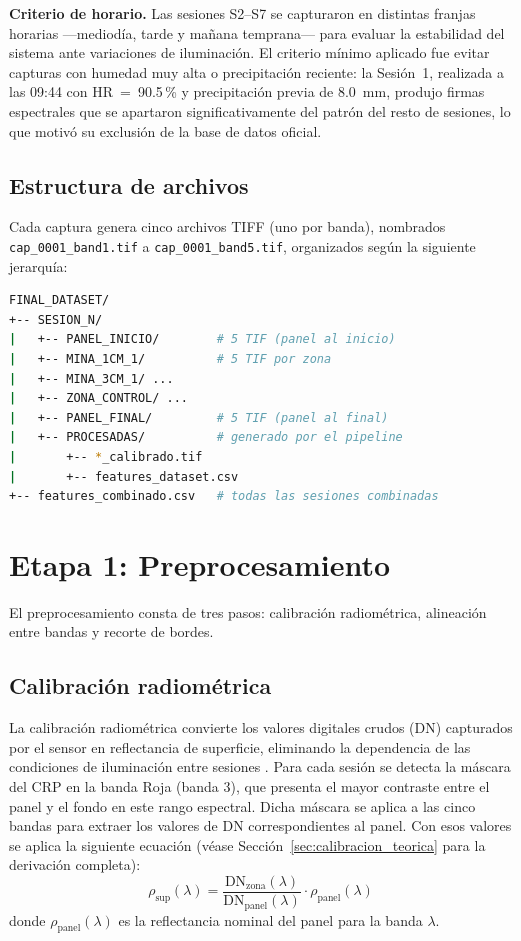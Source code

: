 \textbf{Criterio de horario.} Las sesiones S2--S7 se capturaron en distintas
franjas horarias ---mediodía, tarde y mañana temprana--- para
evaluar la estabilidad del sistema ante variaciones de iluminación. El
criterio mínimo aplicado fue evitar capturas con humedad muy alta o
precipitación reciente: la Sesión~1, realizada a las 09:44 con
HR~=~90.5\,\% y precipitación previa de 8.0~mm, produjo firmas espectrales
que se apartaron significativamente del patrón del resto de sesiones, lo que
motivó su exclusión de la base de datos oficial.

\subsection{Estructura de archivos}

Cada captura genera cinco archivos TIFF (uno por banda), nombrados
\texttt{cap\_0001\_band1.tif} a \texttt{cap\_0001\_band5.tif}, organizados
según la siguiente jerarquía:

\begin{lstlisting}[language=bash, caption={Estructura del conjunto de datos}, label={lst:estructura}]
FINAL_DATASET/
+-- SESION_N/
|   +-- PANEL_INICIO/        # 5 TIF (panel al inicio)
|   +-- MINA_1CM_1/          # 5 TIF por zona
|   +-- MINA_3CM_1/ ...
|   +-- ZONA_CONTROL/ ...
|   +-- PANEL_FINAL/         # 5 TIF (panel al final)
|   +-- PROCESADAS/          # generado por el pipeline
|       +-- *_calibrado.tif
|       +-- features_dataset.csv
+-- features_combinado.csv   # todas las sesiones combinadas
\end{lstlisting}

\section{Etapa 1: Preprocesamiento}

El preprocesamiento consta de tres pasos: calibración radiométrica, alineación entre bandas y recorte
de bordes.

\subsection{Calibración radiométrica}

La calibración radiométrica convierte los valores digitales crudos (DN) capturados
por el sensor en reflectancia de superficie, eliminando la dependencia de las
condiciones de iluminación entre sesiones \cite{daniels2023}. Para cada sesión
se detecta la máscara del \ac{CRP} en la banda Roja (banda 3), que presenta el
mayor contraste entre el panel y el fondo en este rango espectral. Dicha máscara
se aplica a las cinco bandas para extraer los valores de DN correspondientes al
panel. Con esos valores se aplica la siguiente ecuación (véase
Sección~\ref{sec:calibracion_teorica} para la derivación completa):
\begin{equation*}
  \rho_{\text{sup}}(\lambda) =
  \frac{\text{DN}_{\text{zona}}(\lambda)}{\text{DN}_{\text{panel}}(\lambda)}
  \cdot \rho_{\text{panel}}(\lambda)
\end{equation*}
donde $\rho_{\text{panel}}(\lambda)$ es la reflectancia nominal del panel
para la banda $\lambda$.

